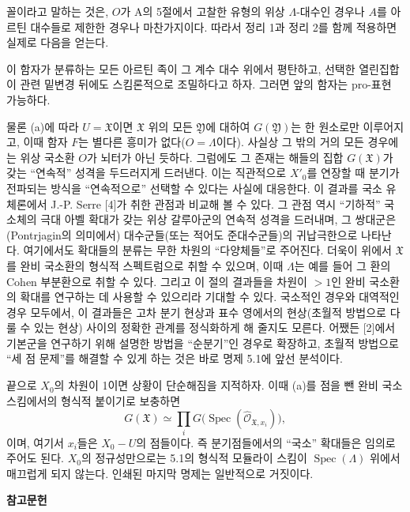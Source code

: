 꼴이라고 말하는 것은, $O$가 A의 5절에서 고찰한 유형의 위상
$\Lambda$-대수인 경우나 $A$를 아르틴 대수들로 제한한 경우나 마찬가지이다.
따라서 정리 1과 정리 2를 함께 적용하면 실제로 다음을 얻는다.

 이 함자가 분류하는 모든 아르틴 족이 그 계수 대수 위에서
평탄하고, 선택한 열린집합이 관련 밑변경 뒤에도 스킴론적으로 조밀하다고 하자.
그러면 앞의 함자는 pro-표현 가능하다.

물론 (a)에 따라 $U=\mathfrak X$이면 $\mathfrak X$ 위의 모든
$\mathfrak Y$에 대하여 $G(\mathfrak Y)$는 한 원소로만 이루어지고, 이때
함자 $F$는 별다른 흥미가 없다($O=\Lambda$이다). 사실상 그 밖의 거의 모든
경우에는 위상 국소환 $O$가 뇌터가 아닌 듯하다. 그럼에도 그 존재는 해들의
집합 $G(\mathfrak X)$가 갖는 ``연속적'' 성격을 두드러지게 드러낸다. 이는
직관적으로 $X'_0$를 연장할 때 분기가 전파되는 방식을 ``연속적으로'' 선택할
수 있다는 사실에 대응한다. 이 결과를 국소 유체론에서 J.-P. Serre [4]가
취한 관점과 비교해 볼 수 있다. 그 관점 역시 ``기하적'' 국소체의 극대 아벨
확대가 갖는 위상 갈루아군의 연속적 성격을 드러내며, 그 쌍대군은
(Pontrjagin의 의미에서) 대수군들(또는 적어도 준대수군들)의 귀납극한으로
나타난다. 여기에서도 확대들의 분류는 무한 차원의 ``다양체들''로 주어진다.
더욱이 위에서 $\mathfrak X$를 완비 국소환의 형식적 스펙트럼으로 취할 수
있으며, 이때 $\Lambda$는 예를 들어 그 환의 Cohen 부분환으로 취할 수 있다.
그리고 이 절의 결과들을 차원이 $>1$인 완비 국소환의 확대를 연구하는 데
사용할 수 있으리라 기대할 수 있다. 국소적인 경우와 대역적인 경우 모두에서,
이 결과들은 고차 분기 현상과 표수 영에서의 현상(초월적 방법으로 다룰 수
있는 현상) 사이의 정확한 관계를 정식화하게 해 줄지도 모른다. 어쨌든 [2]에서
기본군을 연구하기 위해 설명한 방법을 ``순분기''인 경우로 확장하고, 초월적
방법으로 ``세 점 문제''를 해결할 수 있게 하는 것은 바로 명제 5.1에 앞선
분석이다.

끝으로 $X_0$의 차원이 1이면 상황이 단순해짐을 지적하자. 이때 (a)를 점을
뺀 완비 국소 스킴에서의 형식적 붙이기로 보충하면
\[
  G(\mathfrak X)\simeq
  \prod_iG\bigl(\operatorname{Spec}(\widehat{\mathcal O}_{\mathfrak X,x_i})\bigr),
\]
이며, 여기서 $x_i$들은 $X_0-U$의 점들이다. 즉 분기점들에서의 ``국소''
확대들은 임의로 주어도 된다. $X_0$의 정규성만으로는 5.1의 형식적 모듈라이
스킴이 $\operatorname{Spec}(\Lambda)$ 위에서 매끄럽게 되지 않는다. 인쇄된
마지막 명제는 일반적으로 거짓이다.

\begin{center}
  \textbf{참고문헌}
\end{center}

